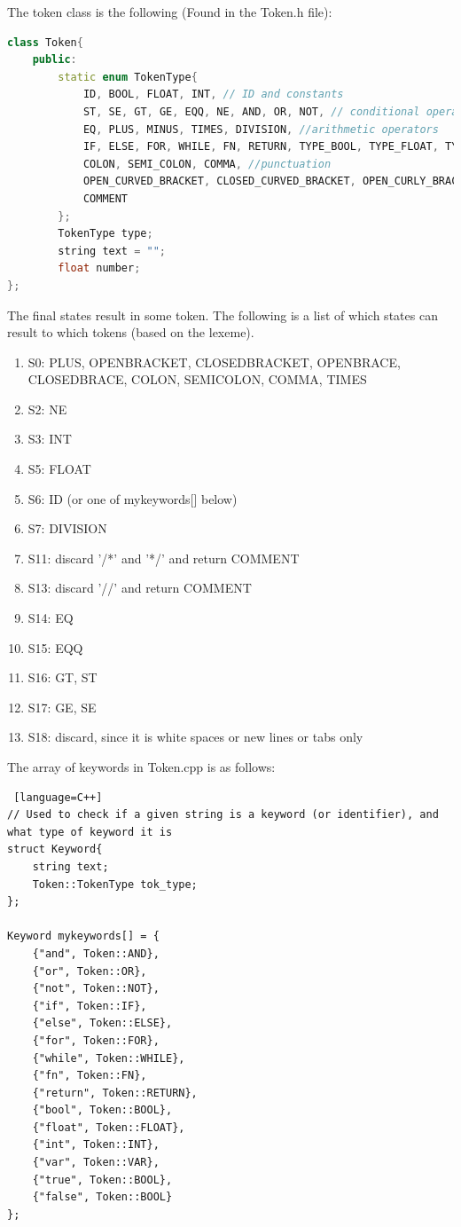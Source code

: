 The token class is the following (Found in the Token.h file):
\begin{lstlisting}[language=C++]
class Token{
	public:
		static enum TokenType{
			ID, BOOL, FLOAT, INT, // ID and constants
			ST, SE, GT, GE, EQQ, NE, AND, OR, NOT, // conditional operators
			EQ, PLUS, MINUS, TIMES, DIVISION, //arithmetic operators
			IF, ELSE, FOR, WHILE, FN, RETURN, TYPE_BOOL, TYPE_FLOAT, TYPE_INT, VAR, //keywords
			COLON, SEMI_COLON, COMMA, //punctuation
			OPEN_CURVED_BRACKET, CLOSED_CURVED_BRACKET, OPEN_CURLY_BRACKET, CLOSED_CURLY_BRACKET, //brackets punctuation
			COMMENT
		};
		TokenType type;
		string text = "";
		float number;
};
\end{lstlisting}

The final states result in some token. The following is a list of which states can result to which tokens (based on the lexeme).
\begin{enumerate}
	\item S0: PLUS, OPEN\textunderscore BRACKET, CLOSED\textunderscore BRACKET, OPEN\textunderscore BRACE, CLOSED\textunderscore BRACE, COLON, SEMI\textunderscore COLON, COMMA, TIMES
	\item S2: NE
	\item S3: INT
	\item S5: FLOAT
	\item S6: ID (or one of mykeywords[] below)
	\item S7: DIVISION
	\item S11: discard '/*' and '*/' and return COMMENT
	\item S13: discard '//' and return COMMENT
	\item S14: EQ
	\item S15: EQQ
	\item S16: GT, ST
	\item S17: GE, SE
	\item S18: discard, since it is white spaces or new lines or tabs only
\end{enumerate}

The array of keywords in Token.cpp is as follows:
\begin{lstlisting} [language=C++]
// Used to check if a given string is a keyword (or identifier), and what type of keyword it is
struct Keyword{
	string text;
	Token::TokenType tok_type;
};

Keyword mykeywords[] = {
	{"and", Token::AND},
	{"or", Token::OR},
	{"not", Token::NOT},
	{"if", Token::IF},
	{"else", Token::ELSE},
	{"for", Token::FOR},
	{"while", Token::WHILE},
	{"fn", Token::FN},
	{"return", Token::RETURN},
	{"bool", Token::BOOL},
	{"float", Token::FLOAT},
	{"int", Token::INT},
	{"var", Token::VAR},
	{"true", Token::BOOL},
	{"false", Token::BOOL}
};
\end{lstlisting}